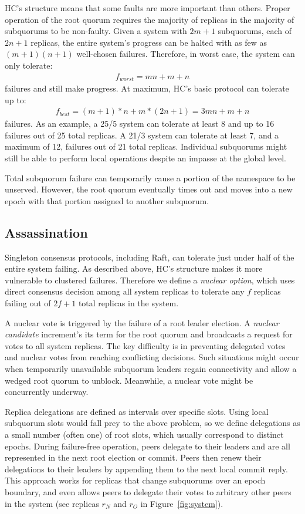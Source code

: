 \documentclass[10pt,conference]{IEEEtran}
\newcommand{\sub}{subquorum\xspace}
\newcommand{\subs}{subquorums\xspace}
\newcommand{\roo}{root quorum\xspace}
\begin{document}
HC's structure means that some faults are more important than others.
Proper operation of the \roo requires the majority of replicas in the majority of \subs to
be non-faulty.
Given a system with $2m+1$ \subs, each of $2n+1$ replicas, the entire
system's progress can be halted with as few as $(m+1)(n+1)$ well-chosen
failures.
Therefore, in worst case, the system can only tolerate:
\begin{align*}
f_{worst}=mn+m+n
\end{align*}
failures and still make progress.
At maximum, HC's basic protocol can tolerate up to:
\begin{align*}
f_{best} = (m+1)*n + m*(2n+1) = 3mn+m+n
\end{align*}
failures.
As an example, a 25/5 system can tolerate at least 8 and
up to 16 failures out of 25 total replicas.
A 21/3 system can tolerate at least 7, and a maximum of 12,
failures out of 21 total replicas.
Individual \subs might
still be able to perform local operations despite an impasse at the global level.

Total \sub failure can temporarily cause a portion of the namespace to be unserved. However, the \roo
eventually times out and moves into a new epoch with that portion assigned to another
\sub.

\subsection{Assassination}
\label{section:assassination}

Singleton consensus protocols, including Raft, can tolerate just under half of the entire system
failing.
As described above, HC's structure makes it more vulnerable to clustered failures.
Therefore we define a \emph{nuclear option}, which uses direct consensus
decision among all system replicas to tolerate any $f$ replicas
failing out of $2f+1$ total replicas in the system.

A nuclear vote is triggered by the failure of a root leader election.
A \emph{nuclear candidate}
increment's its term for the \roo and broadcasts a request for votes to all
system replicas.
The key difficulty is in preventing delegated votes and
nuclear votes from reaching conflicting decisions.
Such situations might occur when temporarily unavailable \sub leaders regain connectivity
and allow a wedged \roo to unblock.
Meanwhile, a nuclear vote might be concurrently underway.

Replica delegations are defined as intervals over specific slots.
Using local \sub slots would fall prey to the above problem, so we define
delegations as a small number (often one) of root slots, which usually
correspond to distinct epochs.
During failure-free operation, peers delegate to their leaders and are all
represented in the next root election or commit.
Peers then renew their delegations to their leaders by appending them to the
next local commit reply.
This approach works for replicas that change \subs over an epoch
boundary, and even allows peers to delegate their votes to arbitrary other
peers in the system (see replicas $r_N$ and $r_O$ in Figure~\ref{fig:system}).
\end{document}

